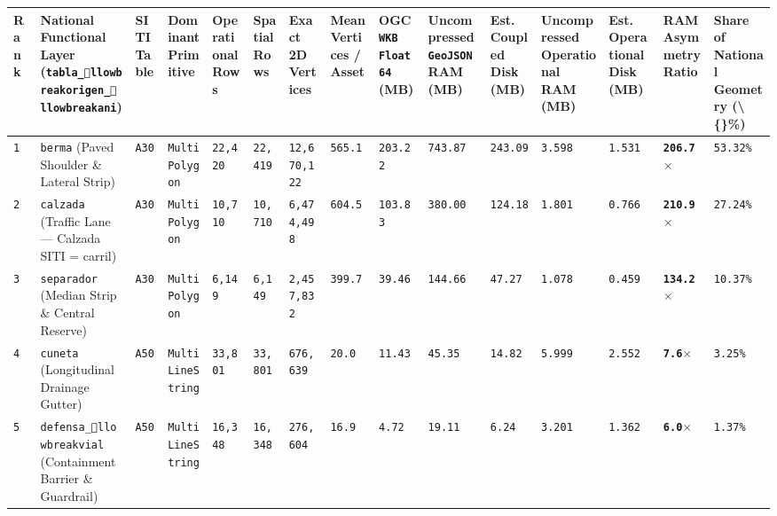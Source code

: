\documentclass[10pt,a4paper]{article}
\begin{document}
{\scriptsize
\begin{longtable}{p{}p{}p{}p{}p{}p{}p{}p{}p{}p{}p{}p{}p{}p{}p{}}
\toprule
\textbf{Rank} & \textbf{National Functional Layer (\texttt{tabla\_llowbreak{}origen\_llowbreak{}ani})} & \textbf{SITI Table} & \textbf{Dominant Primitive} & \textbf{Operational Rows} & \textbf{Spatial Rows} & \textbf{Exact 2D Vertices} & \textbf{Mean Vertices / Asset} & \textbf{OGC \texttt{WKB} \texttt{Float64} (MB)} & \textbf{Uncompressed \texttt{GeoJSON} RAM (MB)} & \textbf{Est. Coupled Disk (MB)} & \textbf{Uncompressed Operational RAM (MB)} & \textbf{Est. Operational Disk (MB)} & \textbf{RAM Asymmetry Ratio} & \textbf{Share of National Geometry (\textbackslash\{\}\%)} \\
\midrule
\endhead
\texttt{1} & \texttt{berma} (Paved Shoulder \& Lateral Strip) & \texttt{A30} & \texttt{MultiPolygon} & \texttt{22,420} & \texttt{22,419} & \texttt{12,670,122} & \texttt{565.1} & \texttt{203.22} & \texttt{743.87} & \texttt{243.09} & \texttt{3.598} & \texttt{1.531} & \textbf{\texttt{206.7$\times$}} & \texttt{53.32\%} \\
\texttt{2} & \texttt{calzada} (Traffic Lane --- Calzada SITI = carril) & \texttt{A30} & \texttt{MultiPolygon} & \texttt{10,710} & \texttt{10,710} & \texttt{6,474,498} & \texttt{604.5} & \texttt{103.83} & \texttt{380.00} & \texttt{124.18} & \texttt{1.801} & \texttt{0.766} & \textbf{\texttt{210.9$\times$}} & \texttt{27.24\%} \\
\texttt{3} & \texttt{separador} (Median Strip \& Central Reserve) & \texttt{A30} & \texttt{MultiPolygon} & \texttt{6,149} & \texttt{6,149} & \texttt{2,457,832} & \texttt{399.7} & \texttt{39.46} & \texttt{144.66} & \texttt{47.27} & \texttt{1.078} & \texttt{0.459} & \textbf{\texttt{134.2$\times$}} & \texttt{10.37\%} \\
\texttt{4} & \texttt{cuneta} (Longitudinal Drainage Gutter) & \texttt{A50} & \texttt{MultiLineString} & \texttt{33,801} & \texttt{33,801} & \texttt{676,639} & \texttt{20.0} & \texttt{11.43} & \texttt{45.35} & \texttt{14.82} & \texttt{5.999} & \texttt{2.552} & \textbf{\texttt{7.6$\times$}} & \texttt{3.25\%} \\
\texttt{5} & \texttt{defensa\_llowbreak{}vial} (Containment Barrier \& Guardrail) & \texttt{A50} & \texttt{MultiLineString} & \texttt{16,348} & \texttt{16,348} & \texttt{276,604} & \texttt{16.9} & \texttt{4.72} & \texttt{19.11} & \texttt{6.24} & \texttt{3.201} & \texttt{1.362} & \textbf{\texttt{6.0$\times$}} & \texttt{1.37\%} \\

\end{longtable}}
\end{document}
